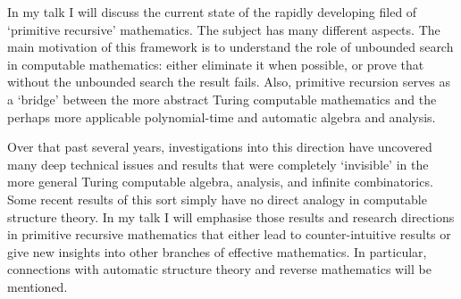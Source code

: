 \documentclass[bsl,meeting]{asl}
\newcommand{\NP}{}
\begin{document}
\thispagestyle{empty}


\NP
{}

In my talk I will discuss the current state of the rapidly developing filed of `primitive recursive' mathematics. The subject has many different aspects. The main motivation of this framework is to understand the role of unbounded search in computable mathematics: either eliminate it when possible, or prove that without the unbounded search the result fails.
Also, primitive recursion serves as a `bridge' between the more abstract Turing computable mathematics and the perhaps more applicable polynomial-time and automatic algebra and analysis.

 Over that past several years, investigations into this direction have uncovered many deep technical issues and results that were completely `invisible' in the more general  Turing computable algebra, analysis, and infinite combinatorics. Some recent results of this sort simply have no direct analogy in computable structure theory.
In my talk I will emphasise those results and research directions in primitive recursive mathematics that either lead to counter-intuitive results or give new insights into other branches of effective mathematics. In particular, connections  with automatic structure theory  and reverse mathematics will be mentioned.
\end{document}
